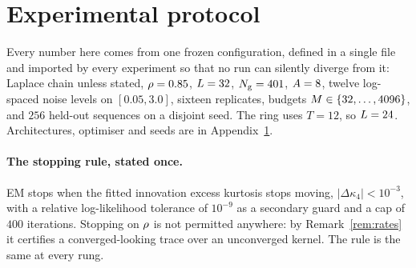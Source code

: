 \section{Experimental protocol}
\label{app:protocol}

Every number here comes from one frozen configuration, defined in a single file and imported by
every experiment so that no run can silently diverge from it: Laplace chain unless stated,
$\rho=0.85$, $L=32$, $N_{\mathrm{g}}=401$, $A=8$, twelve log-spaced noise levels on
$[0.05,3.0]$, sixteen replicates, budgets $M\in\{32,\dots,4096\}$, and $256$ held-out
sequences on a disjoint seed. The ring uses $T=12$, so $L=24$. Architectures, optimiser and
seeds are in Appendix~\ref{app:protocol}.

\paragraph{The stopping rule, stated once.} EM stops when the fitted innovation excess kurtosis
stops moving, $|\Delta\kappa_4|<10^{-3}$, with a relative log-likelihood tolerance of $10^{-9}$ as
a secondary guard and a cap of $400$ iterations. Stopping on $\rho$ is not permitted anywhere:
by Remark~\ref{rem:rates} it certifies a converged-looking trace over an unconverged kernel. The
rule is the same at every rung.


